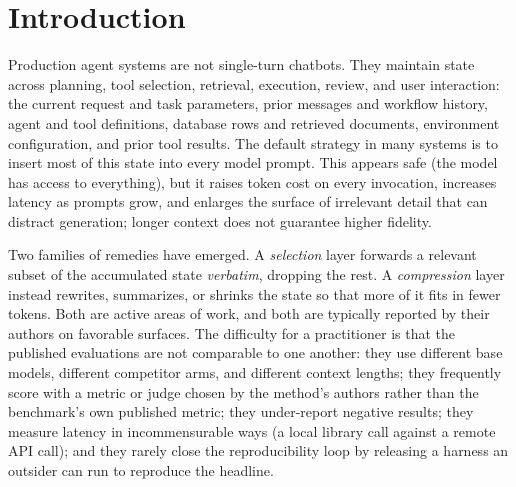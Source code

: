 \documentclass[11pt]{article}
\newcommand{\pp}{~pp}          %
\begin{document}
\begin{abstract}
replication reproduced the primary RULER finding (the selection layer beats full context at
both lengths under Holm-corrected per-length McNemar, pooled $+4.62\pp$, $32.7\%$ fewer
tokens, lowest end-to-end cost) with the system reached only through a versioned hosted
adapter and no engine code in the harness. The extraction and rerun are ours, so the
independence established is of the code path, not the operator; a fully independent rerun, which
the released harness enables, remains open. We include a named commercial compression API at
parity (a small positive delta, not significant under the primary per-length test) and a
four-class latency-measurement methodology whose network decomposition is deliberately
constructed to favor the remote vendor. \textbf{(5)} We define an iso-quality selection-layer benchmark and sketch a
capacity-constrained extension with safe escalation as future work. Every number traces to a
results document and a checksummed artifact manifest; the harness, configurations, and seeds
are released with the paper.
\end{abstract}

\section{Introduction}
\label{sec:intro}

Production agent systems are not single-turn chatbots. They maintain state across planning,
tool selection, retrieval, execution, review, and user interaction: the current request and
task parameters, prior messages and workflow history, agent and tool definitions, database rows
and retrieved documents, environment configuration, and prior tool results. The default
strategy in many systems is to insert most of this state into every model prompt. This appears
safe (the model has access to everything), but it raises token cost on every invocation,
increases latency as prompts grow, and enlarges the surface of irrelevant detail that can
distract generation; longer context does not guarantee higher fidelity.

Two families of remedies have emerged. A \emph{selection} layer forwards a relevant subset of
the accumulated state \emph{verbatim}, dropping the rest. A \emph{compression} layer instead
rewrites, summarizes, or shrinks the state so that more of it fits in fewer tokens. Both are
active areas of work, and both are typically reported by their authors on favorable surfaces.
The difficulty for a practitioner is that the published evaluations are not comparable to one
another: they use different base models, different competitor arms, and different context
lengths; they frequently score with a metric or judge chosen by the method's authors rather
than the benchmark's own published metric; they under-report negative results; they measure latency
in incommensurable ways (a local library call against a remote API call); and they rarely close
the reproducibility loop by releasing a harness an outsider can run to reproduce the headline.
\end{document}
